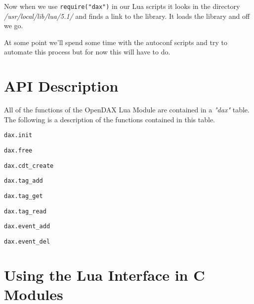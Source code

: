 Now when we use \verb|require("dax")| in our Lua scripts it looks in the directory \textit{/usr/local/lib/lua/5.1/} and finds a link to the library.  It loads the library and off we go.

At some point we'll spend some time with the autoconf scripts and try to automate this process but for now this will have to do.

\section{API Description}

All of the functions of the OpenDAX Lua Module are contained in a \textit{"dax"} table.  The following is a description of the functions contained in this table.

\begin{verbatim}
dax.init
\end{verbatim}

\begin{verbatim}
dax.free
\end{verbatim}

\begin{verbatim}
dax.cdt_create
\end{verbatim}

\begin{verbatim}
dax.tag_add
\end{verbatim}

\begin{verbatim}
dax.tag_get
\end{verbatim}

\begin{verbatim}
dax.tag_read
\end{verbatim}

\begin{verbatim}
dax.event_add
\end{verbatim}

\begin{verbatim}
dax.event_del
\end{verbatim}

\section{Using the Lua Interface in C Modules}

